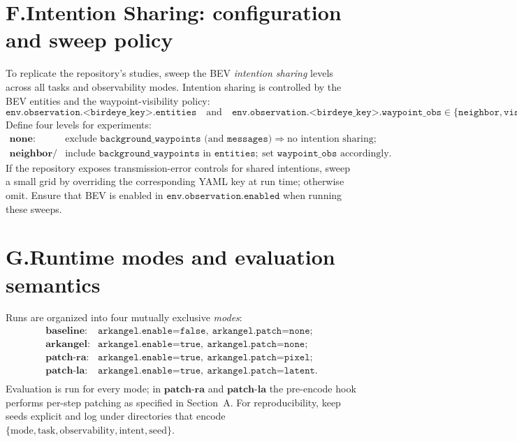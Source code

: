 \documentclass[11pt]{article}
\begin{document}
\section*{F.\quad Intention Sharing: configuration and sweep policy}
To replicate the repository’s studies, sweep the BEV \emph{intention sharing} levels across all tasks and observability modes. Intention sharing is controlled by the BEV entities and the waypoint-visibility policy:
\[
\texttt{env.observation.<birdeye\_key>.entities}\quad\text{and}\quad
\texttt{env.observation.<birdeye\_key>.waypoint\_obs}\in\{\texttt{neighbor},\texttt{visible},\texttt{all}\}.
\]
Define four levels for experiments:
\[
\begin{array}{ll}
\textbf{none:} & \text{exclude } \texttt{background\_waypoints} \text{ (and } \texttt{messages} \text{)} \Rightarrow \text{no intention sharing};\\
\textbf{neighbor/visible/all:} & \text{include } \texttt{background\_waypoints} \text{ in } \texttt{entities};\ \text{set } \texttt{waypoint\_obs} \text{ accordingly}.
\end{array}
\]
If the repository exposes transmission-error controls for shared intentions, sweep a small grid by overriding the corresponding YAML key at run time; otherwise omit. Ensure that BEV is enabled in \(\texttt{env.observation.enabled}\) when running these sweeps.

\section*{G.\quad Runtime modes and evaluation semantics}
Runs are organized into four mutually exclusive \emph{modes}:
\[
\begin{array}{ll}
\textbf{baseline}: & \texttt{arkangel.enable=false},\ \texttt{arkangel.patch=none}; \\[2pt]
\textbf{arkangel}: & \texttt{arkangel.enable=true},\ \texttt{arkangel.patch=none}; \\[2pt]
\textbf{patch-ra}: & \texttt{arkangel.enable=true},\ \texttt{arkangel.patch=pixel}; \\[2pt]
\textbf{patch-la}: & \texttt{arkangel.enable=true},\ \texttt{arkangel.patch=latent}. \\
\end{array}
\]
Evaluation is run for every mode; in \(\textbf{patch-ra}\) and \(\textbf{patch-la}\) the pre-encode hook performs per-step patching as specified in Section~A. For reproducibility, keep seeds explicit and log under directories that encode \(\{\text{mode},\text{task},\text{observability},\text{intent},\text{seed}\}\).
\end{document}
